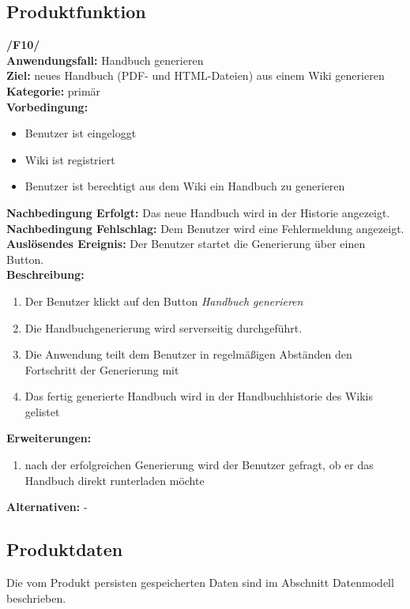 \subsection{Produktfunktion}
	\textbf{/F10/} \\
	\textbf{Anwendungsfall:} Handbuch generieren \\
	\textbf{Ziel:} neues Handbuch (PDF- und HTML-Dateien) aus einem Wiki generieren \\
	\textbf{Kategorie:} primär \\
	\textbf{Vorbedingung:}
		\begin{itemize}
			\item Benutzer ist eingeloggt
			\item Wiki ist registriert
			\item Benutzer ist berechtigt aus dem Wiki ein Handbuch zu generieren
		\end{itemize}
	\textbf{Nachbedingung Erfolgt:} Das neue Handbuch wird in der Historie angezeigt. \\
	\textbf{Nachbedingung Fehlschlag:} Dem Benutzer wird eine Fehlermeldung angezeigt. \\
	\textbf{Auslösendes Ereignis:} Der Benutzer startet die Generierung über einen Button. \\
	\textbf{Beschreibung:}
		\begin{enumerate}
			\item Der Benutzer klickt auf den Button \textit{Handbuch generieren}
			\item Die Handbuchgenerierung wird serverseitig durchgeführt.
			\item Die Anwendung teilt dem Benutzer in regelmäßigen Abständen den Fortschritt der Generierung mit
			\item Das fertig generierte Handbuch wird in der Handbuchhistorie des Wikis gelistet
		\end{enumerate}
	\textbf{Erweiterungen:}
		\begin{enumerate}
			\item nach der erfolgreichen Generierung wird der Benutzer gefragt, ob er das Handbuch direkt runterladen möchte
		\end{enumerate}
	\textbf{Alternativen:} -



\subsection{Produktdaten}
	Die vom Produkt persisten gespeicherten Daten sind im Abschnitt Datenmodell beschrieben.

